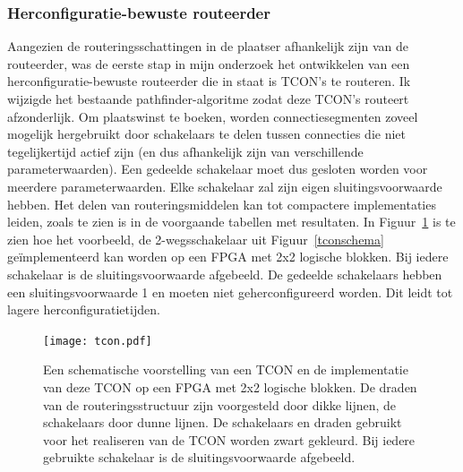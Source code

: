 \documentclass[a4paper,oneside,12pt]{article}
\begin{document}
\subsubsection{Herconfiguratie-bewuste routeerder}\label{router}

Aangezien de routeringsschattingen in de plaatser afhankelijk zijn van de routeerder, was de eerste stap in mijn onderzoek het ontwikkelen van een herconfiguratie-bewuste routeerder die in staat is TCON's te routeren. Ik wijzigde het bestaande pathfinder-algoritme zodat deze TCON's routeert afzonderlijk. Om plaatswinst te boeken, worden connectiesegmenten zoveel mogelijk hergebruikt door schakelaars te delen tussen connecties die niet tegelijkertijd actief zijn (en dus afhankelijk zijn van verschillende parameterwaarden). Een gedeelde schakelaar moet dus gesloten worden voor meerdere parameterwaarden. Elke schakelaar zal zijn eigen sluitingsvoorwaarde hebben. 
Het delen van routeringsmiddelen kan tot compactere implementaties leiden, zoals te zien is in de voorgaande tabellen met resultaten. In Figuur~\ref{tcon} is te zien hoe het voorbeeld, de 2-wegsschakelaar uit Figuur~\ref{tconschema} ge\"implementeerd kan worden op een FPGA met 2x2 logische blokken. Bij iedere schakelaar is de sluitingsvoorwaarde afgebeeld. De gedeelde schakelaars hebben een sluitingsvoorwaarde 1 en moeten niet geherconfigureerd worden. Dit leidt tot lagere herconfiguratietijden.

\begin{figure}%
\centering
\texttt{[image: tcon.pdf]}
\caption{Een schematische voorstelling van een TCON en de implementatie van deze TCON op een FPGA  met 2x2 logische blokken. De draden van de routeringsstructuur zijn voorgesteld door dikke lijnen, de schakelaars door dunne lijnen. De schakelaars en draden gebruikt voor het realiseren van de TCON worden zwart gekleurd. Bij iedere gebruikte schakelaar is de sluitingsvoorwaarde afgebeeld.}
\label{tcon}
\end{figure}

\end{document}
